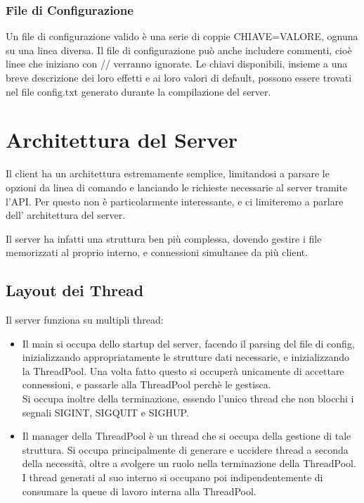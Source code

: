 \documentclass[11pt]{article}
\begin{document}
\begin{flushleft}
\subsubsection{File di Configurazione}

Un file di configurazione valido è una serie di coppie CHIAVE=VALORE, ognuna su una linea diversa.
Il file di configurazione può anche includere commenti, cioè linee che iniziano con // verranno ignorate. Le chiavi disponibili, insieme a una breve descrizione dei loro effetti e ai loro valori di default, possono essere trovati nel file config.txt generato durante la compilazione del server.


\section{Architettura del Server}

Il client ha un architettura estremamente semplice, limitandosi a parsare le opzioni da linea di comando e lanciando le richieste necessarie al server tramite l'API. Per questo non è particolarmente interessante, e ci limiteremo a parlare dell' architettura del server.

Il server ha infatti una struttura ben più complessa, dovendo gestire i file memorizzati al proprio interno, e connessioni simultanee da più client. 

\subsection{Layout dei Thread}
Il server funziona su multipli thread:
\begin{itemize}
\item
Il main si occupa dello startup del server, facendo il parsing del file di config, inizializzando appropriatamente le strutture dati necessarie, e inizializzando la ThreadPool. Una volta fatto questo si occuperà unicamente di accettare connessioni, e passarle alla ThreadPool perchè le gestisca.
\\Si occupa inoltre della terminazione, essendo l'unico thread che non blocchi i segnali SIGINT, SIGQUIT e SIGHUP.

\item
Il manager della ThreadPool è un thread che si occupa della gestione di tale struttura. Si occupa principalmente di generare e uccidere thread a seconda della necessità, oltre a svolgere un ruolo nella terminazione della ThreadPool. I thread generati al suo interno si occupano poi indipendentemente di consumare la queue di lavoro interna alla ThreadPool.


\end{itemize}
\end{flushleft}
\end{document}
